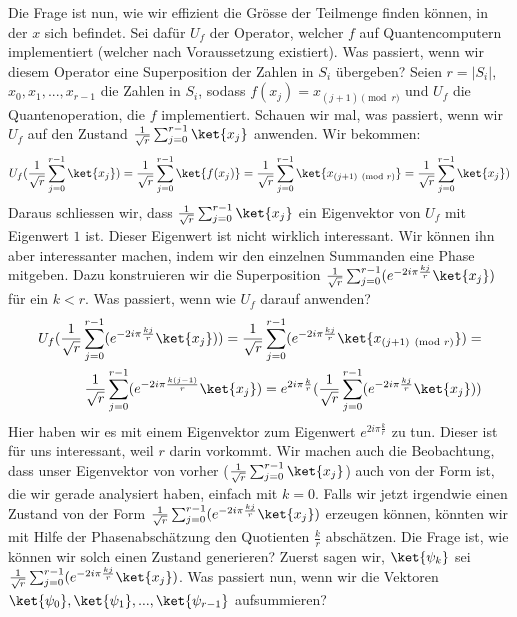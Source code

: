 Die Frage ist nun, wie wir effizient die Grösse der Teilmenge finden können, in der $x$ sich befindet. Sei dafür $U_f$ der Operator, welcher $f$ auf Quantencomputern implementiert (welcher nach Voraussetzung existiert). Was passiert, wenn wir diesem Operator eine Superposition der Zahlen in $S_i$ übergeben? Seien $r = |S_i|$, $x_0, x_1, ..., x_{r - 1}$ die Zahlen in $S_i$, sodass $f(x_j) = x_{(j + 1) \pmod{r}}$ und $U_f$ die Quantenoperation, die $f$ implementiert. Schauen wir mal, was passiert, wenn wir $U_f$ auf den Zustand $\frac{1}{\sqrt{r}}\sum_{j = 0}^{r - 1}\ket{x_j}$ anwenden. Wir bekommen:
\begin{align*}
    U_f(\frac{1}{\sqrt{r}}\sum_{j = 0}^{r - 1}\ket{x_j}) = \frac{1}{\sqrt{r}}\sum_{j = 0}^{r - 1}\ket{f(x_j)} = \frac{1}{\sqrt{r}}\sum_{j = 0}^{r - 1}\ket{x_{(j + 1) \pmod{r}}} = \frac{1}{\sqrt{r}}\sum_{j = 0}^{r - 1}\ket{x_j})
\end{align*}
Daraus schliessen wir, dass $\frac{1}{\sqrt{r}}\sum_{j = 0}^{r - 1}\ket{x_j}$ ein Eigenvektor von $U_f$ mit Eigenwert $1$ ist. Dieser Eigenwert ist nicht wirklich interessant. Wir können ihn aber interessanter machen, indem wir den einzelnen Summanden eine Phase mitgeben. Dazu konstruieren wir die Superposition $\frac{1}{\sqrt{r}}\sum_{j = 0}^{r - 1}(e^{-2i\pi\frac{kj}{r}}\ket{x_j})$ für ein $k < r$. Was passiert, wenn wie $U_f$ darauf anwenden? 
\begin{align*}
    U_f(\frac{1}{\sqrt{r}}\sum_{j = 0}^{r - 1}(e^{-2i\pi\frac{kj}{r}}\ket{x_j})) = \frac{1}{\sqrt{r}}\sum_{j = 0}^{r - 1}(e^{-2i\pi\frac{kj}{r}}\ket{x_{(j + 1) \pmod{r}}}) = \\
    \frac{1}{\sqrt{r}}\sum_{j = 0}^{r - 1}(e^{-2i\pi\frac{k(j - 1)}{r}}\ket{x_j}) = e^{2i\pi\frac{k}{r}}(\frac{1}{\sqrt{r}}\sum_{j = 0}^{r - 1}(e^{-2i\pi\frac{kj}{r}}\ket{x_j}))
\end{align*}
Hier haben wir es mit einem Eigenvektor zum Eigenwert $e^{2i\pi\frac{k}{r}}$ zu tun. Dieser ist für uns interessant, weil $r$ darin vorkommt. Wir machen auch die Beobachtung, dass unser Eigenvektor von vorher ($\frac{1}{\sqrt{r}}\sum_{j = 0}^{r - 1}\ket{x_j}$) auch von der Form ist, die wir gerade analysiert haben, einfach mit $k = 0$. Falls wir jetzt irgendwie einen Zustand von der Form $\frac{1}{\sqrt{r}}\sum_{j = 0}^{r - 1}(e^{-2i\pi\frac{kj}{r}}\ket{x_j})$ erzeugen können, könnten wir mit Hilfe der Phasenabschätzung den Quotienten $\frac{k}{r}$ abschätzen. Die Frage ist, wie können wir solch einen Zustand generieren? Zuerst sagen wir, $\ket{\psi_k}$ sei $\frac{1}{\sqrt{r}}\sum_{j = 0}^{r - 1}(e^{-2i\pi\frac{kj}{r}}\ket{x_j})$. Was passiert nun, wenn wir die Vektoren $\ket{\psi_0}, \ket{\psi_1}, ..., \ket{\psi_{r - 1}}$ aufsummieren?
